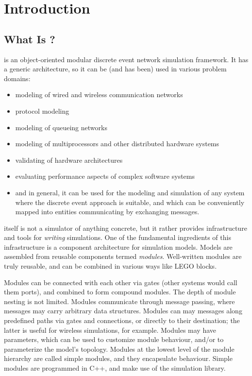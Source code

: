 \chapter{Introduction}
\label{cha:introduction}


\section{What Is {\opp}?}

{\opp} is an object-oriented modular discrete event network simulation
framework. It has a generic architecture, so it can be (and has been)
used in various problem domains:

\begin{itemize}
  \item{modeling of wired and wireless communication networks}
  \item{protocol modeling}
  \item{modeling of queueing networks}
  \item{modeling of multiprocessors and other distributed hardware systems}
  \item{validating of hardware architectures}
  \item{evaluating performance aspects of complex software systems}
  \item{and in general, it can be used for the modeling and simulation of
        any system where the discrete event approach is suitable, and which
        can be conveniently mapped into entities communicating by exchanging
        messages.}
\end{itemize}

{\opp} itself is not a simulator of anything concrete, but it rather
provides infrastructure and tools for \textit{writing} simulations. One of
the fundamental ingredients of this infrastructure is a component
architecture for simulation models. Models are assembled from reusable
components termed \textit{modules}. Well-written modules are truly reusable,
and can be combined in various ways like LEGO blocks.

Modules can be connected with each other via gates (other systems would
call them ports), and combined to form compound modules. The depth of
module nesting is not limited. Modules communicate through message passing,
where messages may carry arbitrary data structures. Modules can may
messages along predefined paths via gates and connections, or directly to
their destination; the latter is useful for wireless simulations, for
example. Modules may have parameters, which can be used to customize module
behaviour, and/or to parameterize the model's topology.
Modules at the lowest level of the module hierarchy are called
simple modules, and they encapsulate behaviour. Simple modules
are programmed in C++, and make use of the simulation library.

